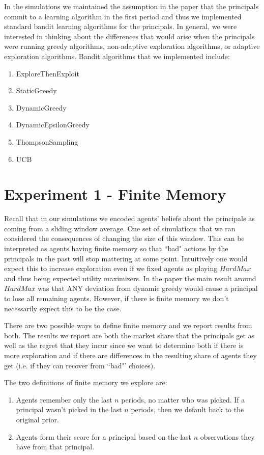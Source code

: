 \documentclass[a4paper]{article}
\begin{document}
In the simulations we maintained the assumption in the paper that the principals commit to a learning algorithm in the first period and thus we implemented standard bandit learning algorithms for the principals. In general, we were interested in thinking about the differences that would arise when the principals were running greedy algorithms, non-adaptive exploration algorithms, or adaptive exploration algorithms. Bandit algorithms that we implemented include:
\begin{enumerate}
\item ExploreThenExploit
\item StaticGreedy
\item DynamicGreedy
\item DynamicEpsilonGreedy
\item ThompsonSampling
\item UCB
\end{enumerate}

\section*{Experiment 1 - Finite Memory}
Recall that in our simulations we encoded agents' beliefs about the principals as coming from a sliding window average. One set of simulations that we ran considered the consequences of changing the size of this window. This can be interpreted as agents having finite memory so that ``bad" actions by the principals in the past will stop mattering at some point. Intuitively one would expect this to increase exploration even if we fixed agents as playing $HardMax$ and thus being expected utility maximizers. In the paper the main result around $HardMax$ was that ANY deviation from dynamic greedy would cause a principal to lose all remaining agents. However, if there is finite memory we don't necessarily expect this to be the case.

There are two possible ways to define finite memory and we report results from both. The results we report are both the market share that the principals get as well as the regret that they incur since we want to determine both if there is more exploration and if there are differences in the resulting share of agents they get (i.e. if they can recover from ``bad"' choices).

The two definitions of finite memory we explore are:
\begin{enumerate}
\item Agents remember only the last $n$ periods, no matter who was picked. If a principal wasn't picked in the last $n$ periods, then we default back to the original prior.
\item Agents form their score for a principal based on the last $n$ observations they have from that principal.
\end{enumerate}
\end{document}
